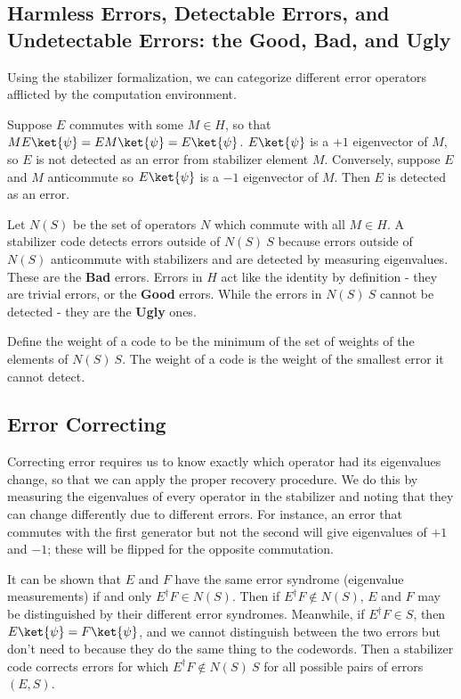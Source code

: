 \subsection{Harmless Errors, Detectable Errors, and Undetectable Errors: the Good, Bad, and Ugly}
Using the stabilizer formalization, we can categorize different error operators afflicted by the computation environment.

Suppose \(E\) commutes with some \(M \in H\), so that
\(ME\ket{\psi} = EM \ket{\psi} = E \ket{\psi}\). \(E\ket{\psi}\) is a \(+1\) eigenvector of \(M\), so \(E\) is not detected as an error from stabilizer element \(M\). Conversely, suppose \(E\) and \(M\) anticommute so \(E\ket{\psi}\) is a \(-1\) eigenvector of \(M\). Then \(E\) is detected as an error.


Let \(N(S)\) be the set of operators \(N\) which commute with all \(M\in H\). A stabilizer code detects errors outside of \(N(S) \ S\) because errors outside of \(N(S)\) anticommute with stabilizers and are detected by measuring eigenvalues. These are the \textbf{Bad} errors. Errors in \(H\) act like the identity by definition - they are trivial errors, or the \textbf{Good} errors. While the errors in \(N(S) \ S\) cannot be detected - they are the \textbf{Ugly} ones.


Define the weight of a code to be the minimum of the set of weights of the elements of \(N(S) \ S\). The weight of a code is the weight of the smallest error it cannot detect.

\subsection{Error Correcting}
Correcting error requires us to know exactly which operator had its eigenvalues change, so that we can apply the proper recovery procedure. We do this by measuring the eigenvalues of every operator in the stabilizer and noting that they can change differently due to different errors. For instance, an error that commutes with the first generator but not the second will give eigenvalues of \(+1\) and \(-1\); these will be flipped for the opposite commutation.

It can be shown that \(E\) and \(F\) have the same error syndrome (eigenvalue measurements) if and only \(E^{\dagger} F \in N(S)\). Then if \(E^{\dagger} F \notin N(S)\), \(E\) and \(F\) may be distinguished by their different error syndromes. Meanwhile, if \(E^{\dagger} F \in S\), then \(E\ket{\psi} = F\ket{\psi}\), and we cannot distinguish between the two errors but don’t need to because they do the same thing to the codewords. Then a stabilizer code corrects errors for which \(E^{\dagger} F \notin N(S) \ S\) for all possible pairs of errors \((E,S)\).


